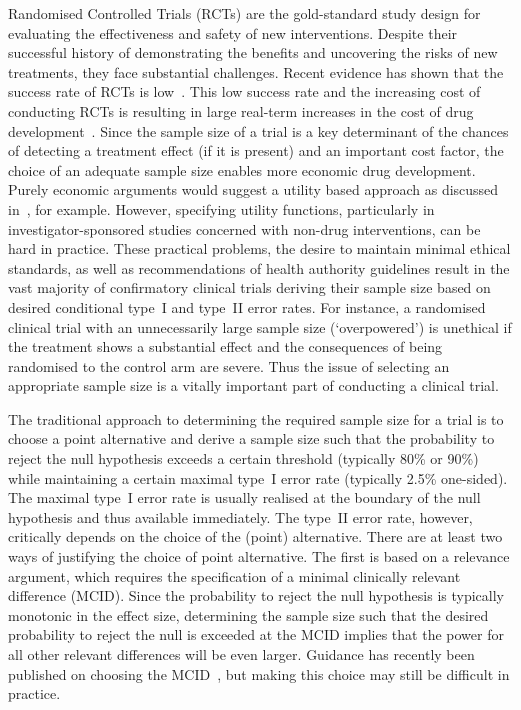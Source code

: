 \documentclass{article}
\begin{document}
Randomised Controlled Trials (RCTs) are the gold-standard study design for evaluating the effectiveness and safety of new interventions.
Despite their successful history of demonstrating the benefits
and uncovering the risks of new treatments,
they face substantial challenges.
Recent evidence has shown that the success rate of RCTs is low~\citep{wong2019estimation}.
This low success rate and the increasing cost of conducting RCTs is resulting in large real-term increases in the cost of drug development~\citep{dimasi2016innovation}.
Since the sample size of a trial is a key determinant of the chances of detecting a treatment effect (if it is present) and
an important cost factor,
the choice of an adequate sample size enables more
economic drug development.
Purely economic arguments would suggest a utility based approach
as discussed in~\citet{lindley-1997}, for example.
However, specifying utility functions, particularly in investigator-sponsored studies concerned with non-drug interventions,
can be hard in practice.
These practical problems, the desire to maintain minimal ethical standards, as well as recommendations of health authority guidelines result in the vast majority of confirmatory clinical trials deriving their sample size based on desired conditional type~I and type~II error rates.
For instance, a randomised clinical trial with an unnecessarily large sample size (`overpowered') is unethical if the treatment shows a substantial effect and the consequences of being randomised to the control arm are severe.
Thus the issue of selecting an appropriate sample size is a vitally important part of conducting a clinical trial.

The traditional approach to determining the required sample size for a trial is to choose a point alternative and
derive a sample size such that the probability to reject the null hypothesis exceeds a certain threshold (typically 80\% or 90\%) while maintaining a certain maximal type~I error rate (typically 2.5\% one-sided).
The maximal type~I error rate is usually realised at the boundary of the null hypothesis and thus available immediately.
The type~II error rate, however, critically depends on the choice of the (point) alternative.
There are at least two ways of justifying the choice of point alternative.
The first is based on a relevance argument, which requires the specification of a minimal clinically relevant difference (MCID).
Since the probability to reject the null hypothesis is typically monotonic in the effect size, determining the sample size such that the desired probability to reject the null is exceeded at the MCID implies that the power for all other relevant differences will be even larger.
Guidance has recently been published on choosing the MCID~\citep{cook2018delta2}, but making this choice may still be difficult in practice.
\end{document}
